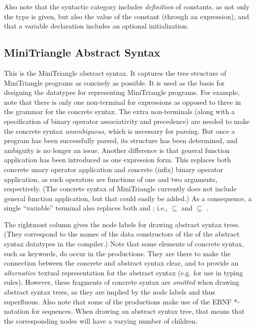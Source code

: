 \documentclass[12pt,a4paper]{article}%
\begin{document}
Also note that the syntactic category  includes
\emph{definition} of constants, as not only the type is given, but also the
value of the constant (through an expression), and that a variable
declaration includes an optional initialization.


\subsection{MiniTriangle Abstract Syntax}
\label{app:mt-as}


This is the MiniTriangle abstract syntax. It captures the tree structure of
MiniTriangle programs as concisely as possible. It is used as the basis for
designing the datatypes for representing MiniTriangle programs. For example,
note that there is only one non-terminal for expressions as opposed to three
in the grammar for the concrete syntax. The extra non-terminals (along with
a specification of binary operator associativity and precedence) are needed to
make the concrete syntax \emph{unambiguous}, which is necessary for parsing. 
But once a program has been successfully parsed, its structure has been
determined, and ambiguity is no longer an issue. Another difference is that
general function application has been introduced as one expression form. This
replaces both concrete unary operator application and concrete (infix) binary
operator application, as such operators \emph{are} functions of one and two
arguments, respectively. (The concrete syntax of MiniTriangle currently does
not include general function application, but that could easily be added.) As
a consequence, a single ``variable'' terminal  also replaces
both  and ; i.e.,
 $\subseteq$  and 
$\subseteq$ .

The rightmost column gives the node labels for drawing abstract syntax trees. 
(They correspond to the names of the data constructors of the of the abstract
syntax datatypes in the compiler.) Note that some elements of concrete syntax,
such as keywords, do occur in the productions. They are there to make the
connection between the concrete and abstract syntax clear, and to provide an
\emph{alternative} textual representation for the abstract syntax (e.g. for
use in typing rules). However, these fragments of concrete syntax are
\emph{omitted} when drawing abstract syntax trees, as they are implied by the
node labels and thus superfluous. Also note that some of the productions make
use of the EBNF *-notation for sequences. When drawing an abstract syntax
tree, that means that the corresponding nodes will have a varying number of
children.
\end{document}
